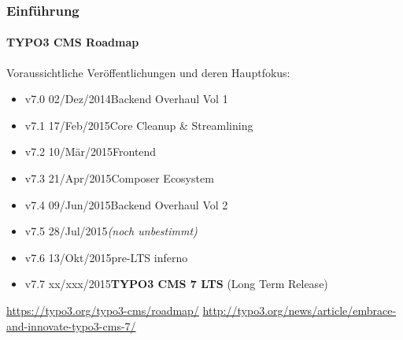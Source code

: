
\begin{frame}[fragile]
	\frametitle{Einführung}
	\framesubtitle{TYPO3 CMS Roadmap}

	Voraussichtliche Veröffentlichungen und deren Hauptfokus:

	\begin{itemize}
		\item
			\begingroup
				\color{typo3orange}
					v7.0 \textrightarrow\tabto{1.3cm}02/Dez/2014\tabto{3.4cm}Backend Overhaul Vol 1
			\endgroup

		\item v7.1 \textrightarrow\tabto{1.3cm}17/Feb/2015\tabto{3.4cm}Core Cleanup \& Streamlining
		\item v7.2 \textrightarrow\tabto{1.3cm}10/Mär/2015\tabto{3.4cm}Frontend
		\item v7.3 \textrightarrow\tabto{1.3cm}21/Apr/2015\tabto{3.4cm}Composer Ecosystem
		\item v7.4 \textrightarrow\tabto{1.3cm}09/Jun/2015\tabto{3.4cm}Backend Overhaul Vol 2
		\item v7.5 \textrightarrow\tabto{1.3cm}28/Jul/2015\tabto{3.4cm}\textit{(noch unbestimmt)}
		\item v7.6 \textrightarrow\tabto{1.3cm}13/Okt/2015\tabto{3.4cm}pre-LTS inferno
		\item v7.7 \textrightarrow\tabto{1.3cm}xx/xxx/2015\tabto{3.4cm}\textbf{TYPO3 CMS 7 LTS} (Long Term Release)
	\end{itemize}

	\smaller
		\url{https://typo3.org/typo3-cms/roadmap/}\newline
		\url{http://typo3.org/news/article/embrace-and-innovate-typo3-cms-7/}
	\normalsize

\end{frame}


